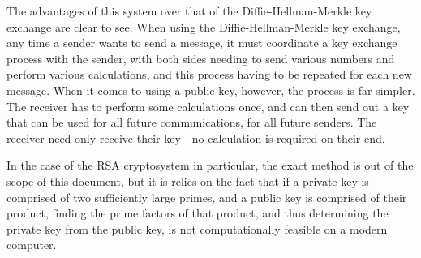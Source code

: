 \documentclass[a4paper,12pt]{report}
\begin{document}
The advantages of this system over that of the Diffie-Hellman-Merkle key
exchange are clear to see. When using the Diffie-Hellman-Merkle key exchange,
any time a sender wants to send a message, it must coordinate a key exchange
process with the sender, with both sides needing to send various numbers and
perform various calculations, and this process having to be repeated for each
new message. When it comes to using a public key, however, the process is far
simpler. The receiver has to perform some calculations once, and can then send
out a key that can be used for all future communications, for all future
senders. The receiver need only receive their key - no calculation is required
on their end.

In the case of the RSA cryptosystem in particular, the exact method is out of
the scope of this document, but it is relies on the fact that if a private key
is comprised of two sufficiently large primes, and a public key is comprised of
their product, finding the prime factors of that product, and thus determining
the private key from the public key, is not computationally feasible on a modern
computer.
\end{document}
